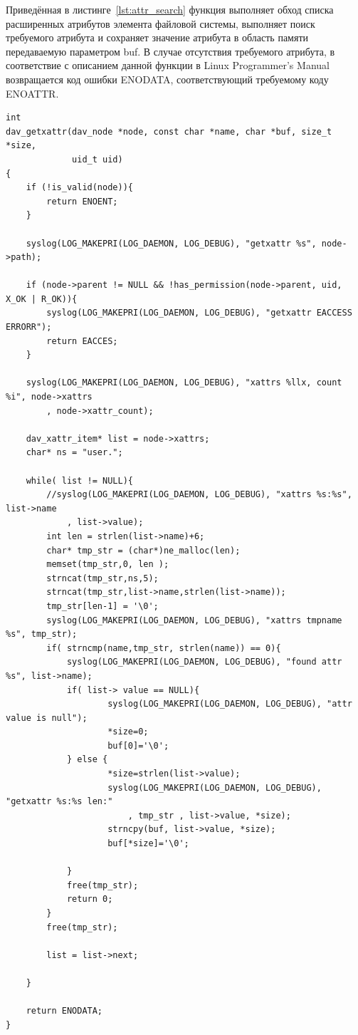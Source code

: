 \documentclass[utf8,usehyperref,12pt]{G7-32}
\begin{document}
Приведённая в листинге~\ref{lst:attr_search} функция выполняет обход списка расширенных атрибутов элемента файловой системы, выполняет поиск требуемого атрибута и сохраняет значение атрибута в область памяти передаваемую параметром buf. В случае отсутствия требуемого атрибута, в соответствие с описанием данной функции в Linux Programmer's Manual\cite{man_getxattr} возвращается код ошибки ENODATA, соответствующий требуемому коду ENOATTR.

\lstset{language=C,caption=Поиск атрибута,label=lst:attr_search}
\begin{lstlisting}
int
dav_getxattr(dav_node *node, const char *name, char *buf, size_t *size,
             uid_t uid)
{
    if (!is_valid(node)){
        return ENOENT;
    }

    syslog(LOG_MAKEPRI(LOG_DAEMON, LOG_DEBUG), "getxattr %s", node->path);

    if (node->parent != NULL && !has_permission(node->parent, uid, X_OK | R_OK)){
    	syslog(LOG_MAKEPRI(LOG_DAEMON, LOG_DEBUG), "getxattr EACCESS ERRORR");
        return EACCES;
    }

    syslog(LOG_MAKEPRI(LOG_DAEMON, LOG_DEBUG), "xattrs %llx, count %i", node->xattrs
    	, node->xattr_count);

    dav_xattr_item* list = node->xattrs;
    char* ns = "user.";

    while( list != NULL){
    	//syslog(LOG_MAKEPRI(LOG_DAEMON, LOG_DEBUG), "xattrs %s:%s", list->name
    		, list->value);
    	int len = strlen(list->name)+6;
		char* tmp_str = (char*)ne_malloc(len);
		memset(tmp_str,0, len );
		strncat(tmp_str,ns,5);
		strncat(tmp_str,list->name,strlen(list->name));
		tmp_str[len-1] = '\0';
		syslog(LOG_MAKEPRI(LOG_DAEMON, LOG_DEBUG), "xattrs tmpname %s", tmp_str);
		if( strncmp(name,tmp_str, strlen(name)) == 0){
			syslog(LOG_MAKEPRI(LOG_DAEMON, LOG_DEBUG), "found attr %s", list->name);
	    	if( list-> value == NULL){
	    			syslog(LOG_MAKEPRI(LOG_DAEMON, LOG_DEBUG), "attr value is null");
	 	   			*size=0;
	    			buf[0]='\0';
	    	} else {
	    			*size=strlen(list->value);
	    			syslog(LOG_MAKEPRI(LOG_DAEMON, LOG_DEBUG), "getxattr %s:%s len:"
		    			, tmp_str , list->value, *size);
					strncpy(buf, list->value, *size);
					buf[*size]='\0';

	    	}
	    	free(tmp_str);
			return 0;
		}
		free(tmp_str);

    	list = list->next;

    }

    return ENODATA;
}
\end{lstlisting}
\end{document}
